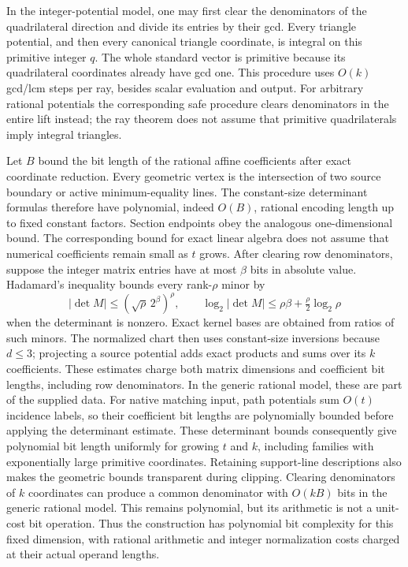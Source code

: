 In the integer-potential model, one may first clear the denominators
of the quadrilateral direction and divide its entries by their gcd.
Every triangle potential, and then every canonical triangle
coordinate, is integral on this primitive integer \(q\).
The whole standard vector is primitive because its quadrilateral
coordinates already have gcd one.
This procedure uses \(O(k)\) gcd/lcm steps per ray, besides scalar
evaluation and output.  For arbitrary rational potentials the
corresponding safe procedure clears denominators in the entire
lift instead; the ray theorem does not assume that primitive
quadrilaterals imply integral triangles.

Let \(B\) bound the bit length of the rational affine coefficients
after exact coordinate reduction.  Every geometric vertex is the
intersection of two source boundary or active minimum-equality
lines.  The constant-size determinant formulas therefore have
polynomial, indeed \(O(B)\), rational encoding length up to fixed
constant factors.  Section endpoints obey the analogous
one-dimensional bound.  The corresponding bound for exact linear
algebra does not assume that numerical coefficients remain small
as \(t\) grows.  After clearing row denominators, suppose the integer
matrix entries have at most \(\beta\) bits in absolute value.
Hadamard's inequality bounds every rank-\(\rho\) minor by
\[
 |\det M|\leq(\sqrt{\rho}\,2^\beta)^\rho,\qquad
 \log_2|\det M|\leq\rho\beta+
                  \tfrac{\rho}{2}\log_2\rho
\]
when the determinant is nonzero.
Exact kernel bases are obtained from ratios of such minors.
The normalized chart then uses constant-size inversions because
\(d\leq3\); projecting a source potential adds exact products and
sums over its \(k\) coefficients.
These estimates charge both matrix dimensions and coefficient bit
lengths, including row denominators.  In the generic rational model,
these are part of the supplied data.
For native matching input, path potentials sum \(O(t)\) incidence
labels, so their coefficient bit lengths are polynomially bounded
before applying the determinant estimate.
These determinant bounds consequently give polynomial bit length
uniformly for growing \(t\) and \(k\), including families with
exponentially large primitive coordinates.
Retaining support-line descriptions also makes the geometric
bounds transparent during clipping.  Clearing denominators of \(k\)
coordinates can produce a common denominator with \(O(kB)\) bits
in the generic rational model.  This remains polynomial, but its
arithmetic is not a unit-cost bit operation.
Thus the construction has polynomial bit complexity for this fixed
dimension, with rational arithmetic and integer normalization costs
charged at their actual operand lengths.

